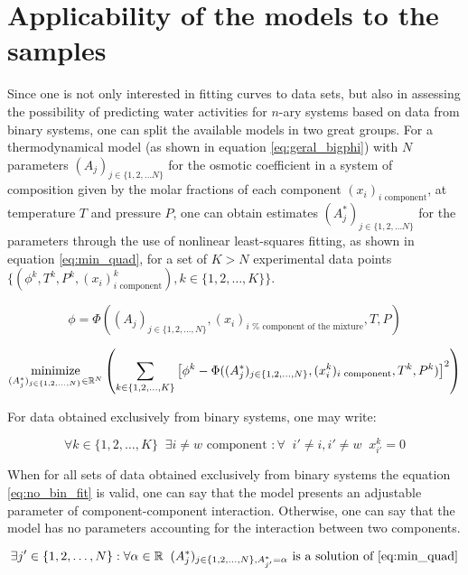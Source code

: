 \section{Applicability of the models to the samples}

Since one is not only interested in fitting curves to data sets, but also in
assessing the possibility of predicting water activities for $n$-ary systems
based on data from binary systems, one can split the available models in two
great groups. For a thermodynamical model (as shown in equation
\ref{eq:geral_bigphi}) with $N$ parameters $(A_j)_{j \in \{1, 2, \ldots N\}}$
for the osmotic coefficient in a system of composition given by the molar
fractions of each component $(x_i)_\text{$i$ component}$, at temperature $T$
and pressure $P$, one can obtain estimates $(A^*_j)_{j \in \{1, 2, \ldots N\}}$
for the parameters through the use of nonlinear least-squares fitting,
as shown in equation \ref{eq:min_quad}, for a set of $K > N$ experimental data
points
$\{(\phi^k, T^k, P^k, (x_i)^k_\text{$i$ component}), k \in \{1,2,\ldots,K\}\}$.

\begin{equation}
	\label{eq:geral_bigphi}
	\phi = \Phi((A_j)_{j \in \{1, 2, \ldots, N\}}, (x_i)_\text{$i$ %
		component of the mixture}, T, P)
\end{equation}

\begin{equation}
	\label{eq:min_quad}
	\minimize_{(A_j^*)_{j \in \{1,2,\ldots,N\}} \in \mathbb{R}^N}%
	\left(\sum_{k \in \{1,2,\ldots,K\}}\left[\phi^k - \Phi((A^*_j)_{j%
	\in \{1, 2, \ldots, N\}}, (x^k_i)_\text{$i$ component},%
	T^k, P^k)\right]^2\right)
\end{equation}

For data obtained exclusively from binary systems, one may write:

\begin{equation}
	\forall k \in \{1,2,\ldots,K\} \;\; \exists i \neq w%
	\text{ component } : \forall \;\; i' \neq i, i' \neq w\;\; x^k_{i'} = 0
\end{equation}

When for all sets of data obtained exclusively from binary systems the equation
\ref{eq:no_bin_fit} is valid, one can say that the model presents an adjustable
parameter of component-component interaction. Otherwise, one can say that the model
has no parameters accounting for the interaction between two components.

\begin{equation}
	\label{eq:no_bin_fit}
	\exists j' \in \{1,2,\ldots,N\} : \forall \alpha \in \mathbb{R}\;\;%
	(A_j^*)_{j \in \{1,2,\ldots,N\}, A_{j'}^* = \alpha}%
	\text{ is a solution of \ref{eq:min_quad}}
\end{equation}

